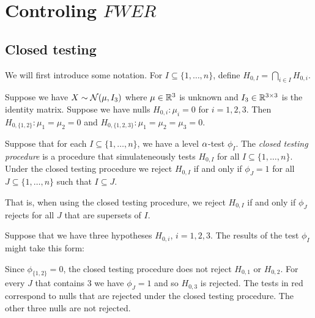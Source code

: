 \section{Controling $FWER$}
\subsection{Closed testing}
We will first introduce some notation. For $I \subseteq \{1,\ldots,n\}$, define $H_{0,I}=\bigcap_{i \in I}H_{0,i}$. 
\begin{ex}
    Suppose we have $X \sim {{\mathcal{N}}}(\mu,I_3)$ where $\mu \in {\mathbb R}^3$ is unknown and $I_3 \in {\mathbb R}^{3\times 3}$ is the identity matrix. Suppose we have nulls $H_{0,i}:\mu_i=0$ for $i=1,2,3$. Then $H_{0,\{1,2\}}:\mu_1=\mu_2=0$ and $H_{0,\{1,2,3\}} : \mu_1=\mu_2=\mu_3=0$. 
\end{ex}
\begin{defn}
    Suppose that for each $I \subseteq \{1,\ldots,n\}$, we have a level ${\alpha}$-test $\phi_I$. The \emph{closed testing procedure} is a procedure that simulateneously tests $H_{0,I}$ for all $I \subseteq \{1,\ldots,n\}$. Under the closed testing procedure we reject $H_{0,I}$ if and only if $\phi_J=1$  for all $J \subseteq \{1,\ldots,n\}$ such that $I \subseteq J$.
\end{defn}
That is, when using the closed testing procedure, we reject $H_{0,I}$ if and only if $\phi_J$ rejects for all $J$ that are supersets of $I$. 
\begin{ex}
    Suppose that we have three hypotheses $H_{0,i}$, $i=1,2,3$. The results of the test $\phi_{I}$ might take this form:
    \begin{center}
\end{center}
    Since $\phi_{\{1,2\}}=0$, the closed testing procedure does not reject $H_{0,1}$ or $H_{0,2}$. For every $J$ that contains $3$ we have $\phi_J = 1$ and so $H_{0,3}$ is rejected. The tests in red correspond to nulls that are rejected under the closed testing procedure. The other three nulls are not rejected.
\end{ex}
